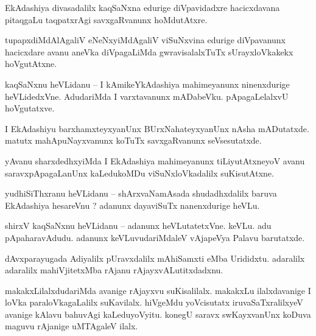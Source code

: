 \documentclass{article}
\begin{document}
\begin{mn}%
EkAdashiya divasadalilx kaqSaNxna edurige diVpavidadxre hacicxdavana pitaqgaLu taqpatxrAgi 
savxgaRvanunx hoMdutAtxre.
\end{mn}

\begin{mn}%
tupapxdiMdAlAgaliV eNeNxyiMdAgaliV viSuNxvina edurige diVpavanunx hacicxdare avanu aneVka 
diVpagaLiMda gwravisalalxTuTx sUrayxloVkakekx hoVgutAtxne.
\end{mn}

\begin{mn}%
kaqSaNxnu heVLidanu -- I kAmikeYkAdashiya mahimeyanunx ninenxdurige heVLidedxVne. AdudariMda I 
varxtavanunx mADabeVku. pApagaLelalxvU hoVgutatxve.
\end{mn}

\begin{mn}%
I EkAdashiyu barxhamxteyxyanUnx BUrxNahateyxyanUnx nAsha mADutatxde. matutx mahApuNayxvanunx koTuTx 
savxgaRvanunx seVsesutatxde.
\end{mn}

\begin{mn}%
yAvanu sharxdedhxyiMda I EkAdashiya mahimeyanunx tiLiyutAtxneyoV avanu saravxpApagaLanUnx 
kaLedukoMDu viSuNxloVkadalilx suKisutAtxne.
\end{mn}


\begin{mn}%
yudhiSiThxranu heVLidanu -- shArxvaNamAsada shudadhxdalilx baruva EkAdashiya hesareVnu ? adanunx 
dayaviSuTx nanenxdurige heVLu.
\end{mn}

\begin{mn}%
shirxV kaqSaNxnu heVLidanu -- adanunx heVLutatetxVne. keVLu. adu pApaharavAdudu. adanunx 
keVLuvudariMdaleV vAjapeVya Palavu barutatxde.
\end{mn}

\begin{mn}%
dAvxparayugada Adiyalilx pUravxdalilx mAhiSamxti eMba Urididxtu. adaralilx adaralilx mahiVjitetxMba 
rAjanu rAjayxvALutitxdadxnu.
\end{mn}

\begin{mn}%
makakxLilalxdudariMda avanige rAjayxvu suKisalilalx. makakxLu ilalxdavanige I loVka 
paraloVkagaLalilx suKavilalx. hiVgeMdu yoVcisutatx iruvaSaTxralilxyeV avanige kAlavu bahuvAgi 
kaLeduyoVyitu. konegU saravx swKayxvanUnx koDuva maguvu rAjanige uMTAgaleV ilalx.
\end{mn}
\end{document}
